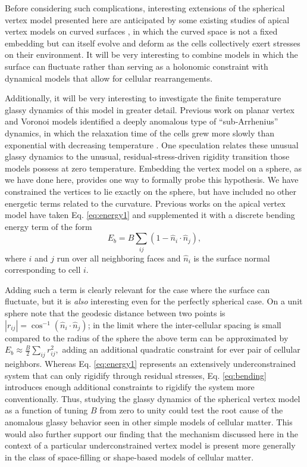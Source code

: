 \documentclass[aps,pre,reprint,superscriptaddress,nofootinbib]{revtex4-2}
\begin{document}
Before considering such complications, interesting extensions of the spherical vertex model presented here are anticipated by some existing studies of apical vertex models on curved surfaces \cite{Fletcher2014,osterfield2013three,murisic2015discrete}, in which the curved space is not a fixed embedding but can itself evolve and deform as the cells collectively exert stresses on their environment. It will be very interesting to combine models in which the surface can fluctuate rather than serving as a holonomic constraint with dynamical models that allow for cellular rearrangements. 


Additionally, it will be very interesting to investigate the finite temperature glassy dynamics of this model in greater detail. Previous work on planar vertex and Voronoi models identified a deeply anomalous type of ``sub-Arrhenius'' dynamics, in which the relaxation time of the cells grew more slowly than exponential with decreasing temperature \cite{Sussman2018epl}. One speculation relates these unusual glassy dynamics to the unusual, residual-stress-driven rigidity transition those models possess at zero temperature. Embedding the vertex model on a sphere, as we have done here, provides one way to formally probe this hypothesis. We have constrained the vertices to lie exactly on the sphere, but have included no other energetic terms related to the curvature. Previous works on the apical vertex model have taken Eq. \ref{eq:energy1} and supplemented it with a discrete bending energy term \cite{seung1988defects} of the form
\begin{equation}\label{eq:bending}
E_b = B\sum_{ij}\left(1-\hat{n}_i\cdot \hat{n}_j\right),
\end{equation}
where $i$ and $j$ run over all neighboring faces and $\hat{n}_i$ is the surface normal corresponding to cell $i$.

Adding such a term is clearly relevant for the case where the surface can fluctuate, but it is \emph{also} interesting even for the perfectly spherical case. On a unit sphere note that the geodesic distance between two points is $|r_{ij}| = \cos^{-1}\left(\hat{n}_i\cdot \hat{n}_j\right)$; in the limit where the inter-cellular spacing is small compared to the radius of the sphere the above term can be approximated by $E_b \approx \frac{B}{2}\sum_{ij}r_{ij}^2,$ adding an additional quadratic constraint for ever pair of cellular neighbors. Whereas Eq. \ref{eq:energy1} represents an extensively underconstrained system that can only rigidify through residual stresses, Eq. \ref{eq:bending} introduces enough additional constraints to rigidify the system more conventionally. Thus, studying the glassy dynamics of the spherical vertex model as a function of tuning $B$ from zero to unity could test the root cause of the anomalous glassy behavior seen in other simple models of cellular matter. This would also further support our finding that the mechanism discussed here in the context of a particular underconstrained vertex model is present more generally in the class of space-filling or shape-based models of cellular matter.
\end{document}
